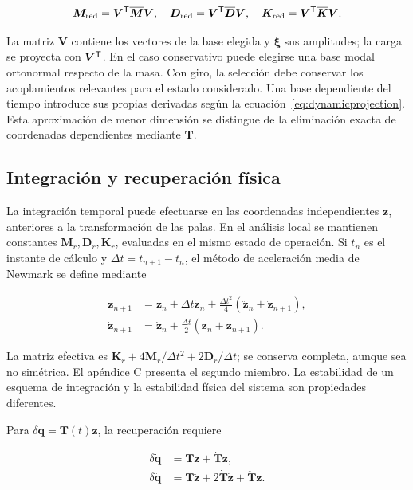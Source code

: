\begin{equation}
\bm M_{\rm red}=\bm V^\mathsf T\overline{\bm M}\bm V,\quad
\bm D_{\rm red}=\bm V^\mathsf T\overline{\bm D}\bm V,\quad
\bm K_{\rm red}=\bm V^\mathsf T\overline{\bm K}\bm V.
\end{equation}

La matriz $\bm V$ contiene los vectores de la base elegida y $\bm\xi$ sus amplitudes; la carga se proyecta con $\bm V^\mathsf T$. En el caso conservativo puede elegirse una base modal ortonormal respecto de la masa. Con giro, la selección debe conservar los acoplamientos relevantes para el estado considerado. Una base dependiente del tiempo introduce sus propias derivadas según la ecuación~\eqref{eq:dynamicprojection}. Esta aproximación de menor dimensión se distingue de la eliminación exacta de coordenadas dependientes mediante $\bm T$.

\subsection{Integración y recuperación física}
La integración temporal puede efectuarse en las coordenadas independientes $\bm z$, anteriores a la transformación de las palas. En el análisis local se mantienen constantes $\bm M_r,\bm D_r,\bm K_r$, evaluadas en el mismo estado de operación. Si $t_n$ es el instante de cálculo y $\Delta t=t_{n+1}-t_n$, el método de aceleración media de Newmark se define mediante

\begin{align}
\bm z_{n+1}&=\bm z_n+\Delta t\dot{\bm z}_n
+\tfrac{\Delta t^2}{4}(\ddot{\bm z}_n+\ddot{\bm z}_{n+1}),\nonumber\\
\dot{\bm z}_{n+1}&=\dot{\bm z}_n+\tfrac{\Delta t}{2}
(\ddot{\bm z}_n+\ddot{\bm z}_{n+1}).
\end{align}

La matriz efectiva es $\bm K_r+4\bm M_r/\Delta t^2+2\bm D_r/\Delta t$; se conserva completa, aunque sea no simétrica. El apéndice C presenta el segundo miembro. La estabilidad de un esquema de integración y la estabilidad física del sistema son propiedades diferentes.

Para $\delta\bm q=\bm T(t)\bm z$, la recuperación requiere

\begin{align}
\delta\dot{\bm q}&=\bm T\dot{\bm z}+\dot{\bm T}\bm z,\nonumber\\
\delta\ddot{\bm q}&=\bm T\ddot{\bm z}+2\dot{\bm T}\dot{\bm z}+\ddot{\bm T}\bm z.
\end{align}

